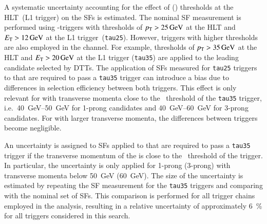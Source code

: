 A systematic uncertainty accounting for the effect of \tauhadvis \pT (\ET)
thresholds at the HLT~(L1 trigger) on the \faketauhadvis SFs is estimated. The
nominal SF measurement is performed using \tauhadvis-triggers with thresholds of
$p_{\text{T}} > \SI{25}{\ensuremath{\text{GeV}}}$ at the HLT and $\ET > \SI{12}{\GeV}$ at the L1
trigger~(\texttt{tau25}). However, triggers with higher thresholds are also
employed in the \hadhad channel. For example, thresholds of
$p_{\text{T}} > \SI{35}{\ensuremath{\text{GeV}}}$ at the HLT and $\ET > \SI{20}{\GeV}$ at the L1 trigger
(\texttt{tau35}) are applied to the leading \tauhadvis candidate selected by
DTTs. The application of SFs measured for \texttt{tau25} triggers to
\faketauhadvis that are required to pass a \texttt{tau35} trigger can introduce
a bias due to differences in selection efficiency between both triggers. This
effect is only relevant for \faketauhadvis with transverse momenta close to the
\pT~threshold of the \texttt{tau35} trigger, i.e.\
\SIrange[range-phrase=--]{40}{50}{\GeV} for 1-prong candidates and
\SIrange[range-phrase=--]{40}{60}{\GeV} for 3-prong candidates. For
\faketauhadvis with larger transverse momenta, the differences between triggers
become negligible.


An uncertainty is assigned to SFs applied to \faketauhadvis that are required to
pass a \texttt{tau35} trigger if the transverse momentum of the \faketauhadvis
is close to the \pT~threshold of the trigger. In particular, the uncertainty is
only applied for 1-prong (3-prong) \faketauhadvis with transverse momenta below
\SI{50}{\GeV} (\SI{60}{\GeV}). The size of the uncertainty is estimated by
repeating the SF measurement for the \texttt{tau35} triggers and comparing with
the nominal set of SFs. This comparison is performed for all trigger chains
employed in the analysis, resulting in a relative uncertainty of approximately
\SI{6}{\percent} for all triggers considered in this search.

